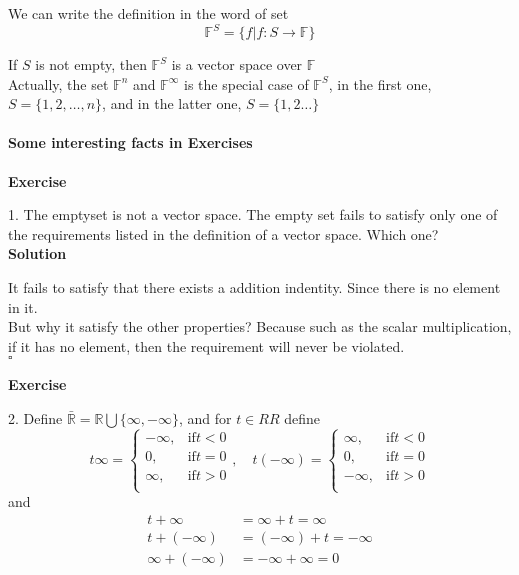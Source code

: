 \documentclass{article}
\newenvironment{exercise}{%
{\textbf{Exercise\\}
    }
}{
}
\newenvironment{solution}{%
{
    \textbf{Solution\\}
    }
}{
  \hfill $\square$ 
  \par\bigskip 
}
\newcommand{\RR}{\mathbb{R}}
\newcommand{\FF}{\mathbb{F}}
\begin{document}
\begin{CJK}{UTF8}{gkai}
We can write the definition in the word of set
\[\FF^S = \{f | f: S \rightarrow \FF \}\]

If $S$ is not empty, then $\FF^S$ is a vector space over $\FF$\\

Actually, the set $\FF^n$ and $\FF^\infty$ is the special case of $\FF^S$, in the first one, $S = \{1,2,\ldots,n\}$, and in the latter one, $S = \{1,2\ldots\}$

\paragraph{Some interesting facts in Exercises\\}

\begin{exercise}
1. The emptyset is not a vector space. The empty set fails to satisfy only one
of the requirements listed in the definition of a vector space. Which
one?\\
\end{exercise}
\begin{solution}
It fails to satisfy that there exists a addition indentity. Since there is no element in it.\\

But why it satisfy the other properties? Because such as the scalar multiplication, if it has no element, then the requirement will never be violated.\\
\end{solution}
\begin{exercise}
2. Define $\bar{\RR} = \RR \bigcup  \{\infty, - \infty\}$, and for $t\in RR$ define
\[t \infty = 
\begin{cases}
    -\infty ,&\text{if} t < 0\\ 
    0 ,&\text{if} t = 0\\ 
    \infty ,&\text{if} t > 0\\     
\end{cases},\quad
t(-\infty) = 
\begin{cases}
    \infty ,&\text{if} t < 0\\ 
    0 ,&\text{if} t = 0\\ 
    -\infty ,&\text{if} t > 0\\     
\end{cases}
\]
and
\[\begin{aligned}
    t + \infty &= \infty + t = \infty\\
    t + (-\infty) &= (-\infty) + t = -\infty\\
    \infty  + (-\infty) &= -\infty + \infty = 0\\
\end{aligned}\]


\end{exercise}
\end{CJK}
\end{document}
